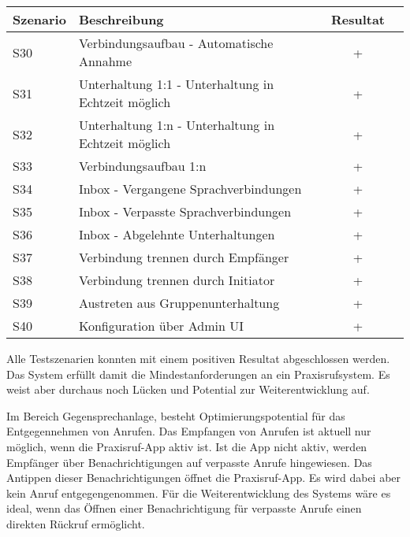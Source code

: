 \begin{table}[h]
    \centering
    \begin{tabular}{|l|p{11cm}|c|c|}
        \hline
        \textbf{Szenario} & \textbf{Beschreibung} & \textbf{Resultat} \\
        \hline
        S30         & Verbindungsaufbau - Automatische Annahme & +\\
        \hline
        S31         & Unterhaltung 1:1 - Unterhaltung in Echtzeit möglich & +\\
        \hline
        S32         & Unterhaltung 1:n - Unterhaltung in Echtzeit möglich & +\\
        \hline
        S33         & Verbindungsaufbau 1:n & +\\
        \hline
        S34         & Inbox - Vergangene Sprachverbindungen & +\\
        \hline
        S35         & Inbox - Verpasste Sprachverbindungen & +\\
        \hline
        S36         & Inbox - Abgelehnte Unterhaltungen & +\\
        \hline
        S37         & Verbindung trennen durch Empfänger & +\\
        \hline
        S38         & Verbindung trennen durch Initiator & +\\
        \hline
        S39         & Austreten aus Gruppenunterhaltung & +\\
        \hline
        S40         & Konfiguration über Admin UI & +\\
        \hline
    \end{tabular}\label{tab:funktion_testplan_2}
\end{table}

Alle Testszenarien konnten mit einem positiven Resultat abgeschlossen werden.
Das System erfüllt damit die Mindestanforderungen an ein Praxisrufsystem.
Es weist aber durchaus noch Lücken und Potential zur Weiterentwicklung auf.

Im Bereich Gegensprechanlage, besteht Optimierungspotential für das Entgegennehmen von Anrufen.
Das Empfangen von Anrufen ist aktuell nur möglich, wenn die Praxisruf-App aktiv ist.
Ist die App nicht aktiv, werden Empfänger über Benachrichtigungen auf verpasste Anrufe hingewiesen.
Das Antippen dieser Benachrichtigungen öffnet die Praxisruf-App.
Es wird dabei aber kein Anruf entgegengenommen.
Für die Weiterentwicklung des Systems wäre es ideal, wenn das Öffnen einer Benachrichtigung für verpasste Anrufe einen direkten Rückruf ermöglicht.


